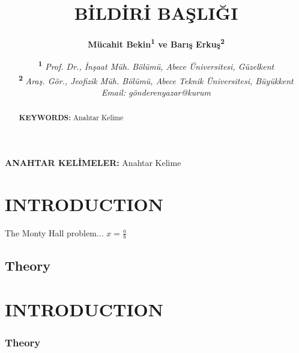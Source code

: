 \documentclass[english]{eqconf}
\title{BİLDİRİ BAŞLIĞI\vspace{2pt}}
\author{\textbf{%
		Mücahit Bekin\textsuperscript{1} ve
		Barış Erkuş\textsuperscript{2}\vspace{1pt}%
}}
\date{\small%
\textsuperscript{\textbf{1}}
\textit{Prof. Dr., İnşaat Müh. Bölümü, Abece Üniversitesi, Güzelkent}\\
\textsuperscript{\textbf{2}}
\textit{Araş. Gör., Jeofizik Müh. Bölümü, Abece Teknik Üniversitesi, 
Büyükkent}\\
\textit{Email: gönderenyazar@kurum}%
}
\begin{document}
 
\maketitle

 \thispagestyle{firststyle}
 
\begin{ozet}   %
	
\blindtext

\textbf{ANAHTAR KELİMELER:} Anahtar Kelime

\end{ozet}

\begin{abstract} %
	
	\blindtext
	
\textbf{KEYWORDS:} Anahtar Kelime
	
\end{abstract}

\vspace{1em}
 
\section{INTRODUCTION}
 
The Monty Hall problem...
$x=\frac{a}{b}$
 
\subsection{Theory}

\blindtext

\section{INTRODUCTION}

\blindtext

\subsubsection*{Theory}

\blindtext

\blindtext

\blindtext

\blindtext

\blindtext
\end{document}
